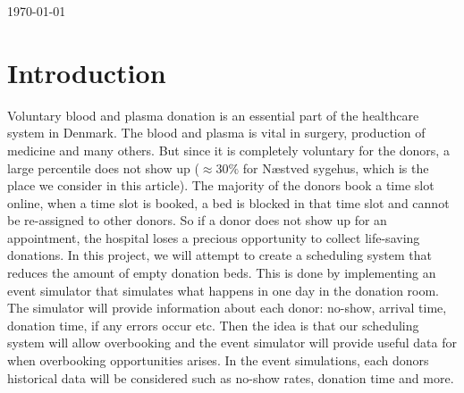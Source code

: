 \documentclass[a4paper,12pt]{article}
\begin{document}
\begin{titlepage}
		
		
		
		\vfill\vfill\vfill %
		
		{\large\today} %
		
		
		\vfill\vfill

		
		\vfill %
		
	\end{titlepage}
	\pagebreak

\thispagestyle{empty}
\newpage
\tableofcontents
\newpage
\setcounter{page}{1}

\section{Introduction}

Voluntary blood and plasma donation is an essential part of the healthcare system in Denmark. The blood and plasma is vital in surgery, production of medicine and many others. But since it is completely voluntary for the donors, a large percentile does not show up ($\approx 30\%$ for Næstved sygehus, which is the place we consider in this article). The majority of the donors book a time slot online, when a time slot is booked, a bed is blocked in that time slot and cannot be re-assigned to other donors. So if a donor does not show up for an appointment, the hospital loses a precious opportunity to collect life-saving donations. In this project, we will attempt to create a scheduling system that reduces the amount of empty donation beds. This is done by implementing an event simulator that simulates what happens in one day in the donation room. The simulator will provide information about each donor: no-show, arrival time, donation time, if any errors occur etc. Then the idea is that our scheduling system will allow overbooking and the event simulator will provide useful data for when overbooking opportunities arises. In the event simulations, each donors historical data will be considered such as no-show rates, donation time and more.
\end{document}
